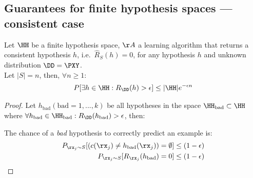 \subsection{Guarantees for finite hypothesis spaces --- consistent case}
\begin{theorem}\label{th:haussler} Let \(\HH\) be a finite hypothesis space, \(\AA\) a learning algorithm that returns a consistent hypothesis \(h\), i.e.\ \(\hat{R}_{S}(h)=0\), for any hypothesis \(h\) and unknown distribution \(\DD=\PXY\).\\
	Let \(|S|=n\), then, \(\forall n \geq 1\):
	\begin{align}
		P[\exists h \in \HH: R_{\DD}(h)>\epsilon]\leq |\HH| e^{-\epsilon n}
	\end{align}
\end{theorem}
\begin{proof}
	Let \(h_{\text{bad}} (\text{bad} = 1, ..., k)\) be all hypotheses in the space \(\HH_{\text{bad}} \subset \HH\) where \( \forall h_{\text{bad}} \in \HH_{\text{bad}}: R_{\DD}(h_{\text{bad}})>\epsilon\), then:

	The chance of a \emph{bad} hypothesis to correctly predict an example is:
	\begin{align}
		P_{\rx_j\sim S}[(c(\rx_j) \neq h_{\text{bad}}(\rx_j))=\emptyset] \leq (1-\epsilon) \\
		P_{\rx_j\sim S}[R_{\rx_j}(h_{\text{bad}})=0] \leq (1-\epsilon)
	\label{haussler:a} \end{align}


\end{proof}
